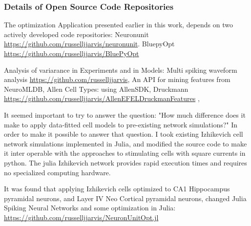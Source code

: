 
\subsubsection{Details of Open Source Code Repositories}
The optimization Application presented earlier in this work, depends on two actively developed code repositories:
Neuronunit \url{https://github.com/russelljjarvis/neuronunit}.
BluepyOpt \url{https://github.com/russelljjarvis/BluePyOpt}

Analysis of variarance in Experiments and in Models:
Multi spiking waveform analysis \url{https://github.com/russelljjarvis},
An API for mining features from NeuroMLDB, Allen Cell Types: using AllenSDK, Druckmann \url{https://github.com/russelljjarvis/AllenEFELDruckmanFeatures}
\cite{birgiolas2019towards}, \cite{birgiolas2016rapid} \cite{druckmann2007novel}

It seemed important to try to answer the question: "How much difference does it make to apply data-fitted cell models to pre-existing network simulations?" In order to make it possible to answer that question. I took existing Izhikevich cell network simulations implemented in Julia, and modified the source code to make it inter operable with the approaches to stimulating cells with square currents in python. The julia Izhikevich network provides rapid execution times and requires no specialized computing hardware.

It was found that applying Izhikevich cells optimized to CA1 Hippocampus pyramidal neurons, and Layer IV Neo Cortical pyramidal neurons, changed 
Julia Spiking Neural Networks and some optimization in Julia:
\url{https://github.com/russelljjarvis/NeuronUnitOpt.jl}
